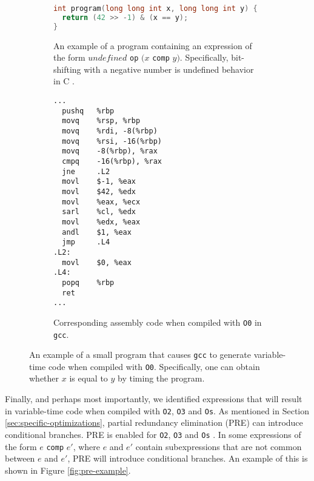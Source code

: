 \begin{figure}[H]
  \centering
     \begin{subfigure}[b]{0.41\textwidth}
        \begin{lstlisting}[style=defstyle,language={C},basicstyle=\ttfamily,breaklines=true]
int program(long long int x, long long int y) { 
  return (42 >> -1) & (x == y); 
}\end{lstlisting} 
      \vspace{6em}
      \caption{An example of a program containing an expression of the form $undefined$ \texttt{op} $(x$ \texttt{comp} $y)$.
      Specifically, bit-shifting with a negative number is undefined behavior in C \citep{c-standard}.}
    \end{subfigure}
    \hspace{1cm}
    \begin{subfigure}[b]{0.3\textwidth}
      \begin{lstlisting}[style=defstyle,language={[x86masm]Assembler},basicstyle=\footnotesize\ttfamily,breaklines=true]
...
  pushq   %rbp
  movq    %rsp, %rbp
  movq    %rdi, -8(%rbp)
  movq    %rsi, -16(%rbp)
  movq    -8(%rbp), %rax
  cmpq    -16(%rbp), %rax
  jne     .L2
  movl    $-1, %eax
  movl    $42, %edx
  movl    %eax, %ecx
  sarl    %cl, %edx
  movl    %edx, %eax
  andl    $1, %eax
  jmp     .L4
.L2:
  movl    $0, %eax
.L4:
  popq    %rbp
  ret
...\end{lstlisting} 
       \caption{Corresponding assembly code when compiled with \texttt{O0} in \texttt{gcc}.}
  \end{subfigure}
  \caption{An example of a small program that causes \texttt{gcc} to generate variable-time code when compiled with \texttt{O0}. Specifically, one can obtain whether $x$ is equal to $y$ by timing the program.}
  \label{fig:vulnerable-expression}
\end{figure}

Finally, and perhaps most importantly, we identified expressions that will result in variable-time code when compiled with \texttt{O2}, \texttt{O3} and \texttt{Os}.
As mentioned in Section \ref{sec:specific-optimizations}, partial redundancy elimination (PRE) can introduce conditional branches.
PRE is enabled for \texttt{O2}, \texttt{O3} and \texttt{Os} \citep{gcc-manual}.
In some expressions of the form $e$ \texttt{comp} $e'$, where $e$ and $e'$ contain subexpressions that are not common between $e$ and $e'$, PRE will introduce conditional branches. An example of this is shown in Figure \ref{fig:pre-example}.

